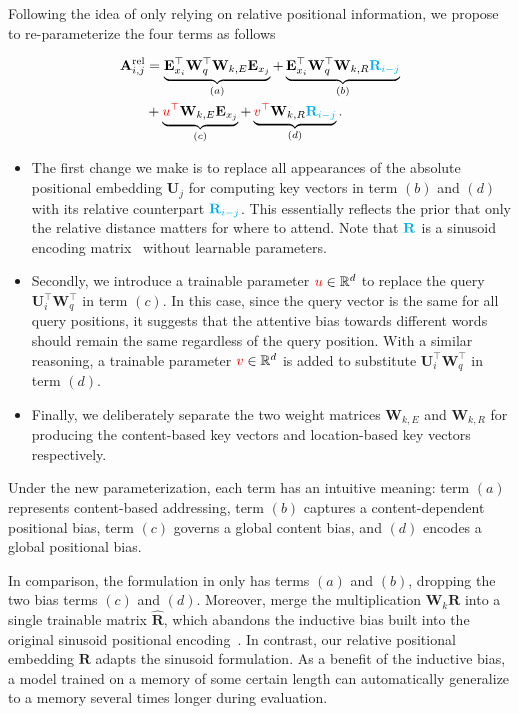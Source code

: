 \documentclass[11pt,a4paper]{article}
\def\rmA{{\mathbf{A}}}
\def\rmE{{\mathbf{E}}}
\def\rmR{{\mathbf{R}}}
\def\rmU{{\mathbf{U}}}
\def\rmW{{\mathbf{W}}}
\newcommand{\R}{\mathbb{R}}
\newcommand{\red}[1]{{\color{red}#1}}
\newcommand{\cyan}[1]{{\color{cyan}#1}}
\begin{document}
Following the idea of only relying on relative positional information, we propose to re-parameterize the four terms as follows
\par\nobreak
\vspace{-0.5em}
\small
\begin{align*}
	\rmA_{i,j}^\text{rel}
	&= \underbrace{ \rmE_{x_i}^\top \rmW_q^\top \rmW_{k,E} \rmE_{x_j} }_{(a)}
	+ \underbrace{\rmE_{x_i}^\top \rmW_q^\top \rmW_{k,R} \cyan{\rmR_{i-j}} }_{(b)} \\
	&+ \underbrace{\red{u^\top} \rmW_{k,E} \rmE_{x_j}}_{(c)}
	+ \underbrace{\red{v^\top} \rmW_{k,R} \cyan{\rmR_{i-j}}}_{(d)}.
\end{align*}
\normalsize
\vspace{-1em}

\begin{itemize}[leftmargin=*,itemsep=0pt,parsep=0.5em,topsep=0pt,partopsep=0pt]
	\item The first change we make is to replace all appearances of the absolute positional embedding $\rmU_{j}$ for computing key vectors in term $(b)$ and $(d)$ with its relative counterpart $\cyan{\rmR_{i-j}}$.
	This essentially reflects the prior that only the relative distance matters for where to attend.
	Note that $\cyan{\rmR}$ is a sinusoid encoding matrix~\citep{vaswani2017attention} without learnable parameters.
	\item Secondly, we introduce a trainable parameter $\red{u} \in \R^{d}$ to replace the query $\rmU_{i}^\top \rmW_q^\top$ in term $(c)$.
	In this case, since the query vector is the same for all query positions, it suggests that the attentive bias towards different words should remain the same regardless of the query position.
	With a similar reasoning, a trainable parameter $\red{v} \in \R^{d}$ is added to substitute $\rmU_{i}^\top \rmW_q^\top$ in term $(d)$.
	\item Finally, we deliberately separate the two weight matrices $\rmW_{k,E}$ and $\rmW_{k,R}$ for producing the content-based key vectors and location-based key vectors respectively.
\end{itemize}
Under the new parameterization, each term has an intuitive meaning: term $(a)$ represents content-based addressing, term $(b)$ captures a content-dependent positional bias, term $(c)$ governs a global content bias, and $(d)$ encodes a global positional bias.

In comparison, the formulation in \citet{shaw2018self} only has terms $(a)$ and $(b)$, dropping the two bias terms $(c)$ and $(d)$.
Moreover, \citet{shaw2018self} merge the multiplication $\rmW_k \rmR$ into a single trainable matrix $\hat{\rmR}$, which abandons the inductive bias built into the original sinusoid positional encoding~\citep{vaswani2017attention}.
In contrast, our relative positional embedding $\rmR$ adapts the sinusoid formulation.
As a benefit of the inductive bias, a model trained on a memory of some certain length can automatically generalize to a memory several times longer during evaluation.
\end{document}

